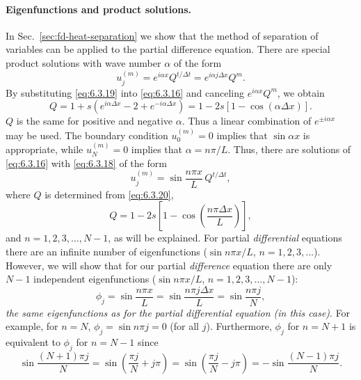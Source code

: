 \paragraph{Eigenfunctions and product solutions.}
In Sec.~\ref{sec:fd-heat-separation} we show that the method of separation of variables can be applied to the partial difference equation.  There are special product solutions with wave number $\alpha$ of the form
\begin{equation}
u_j^{(m)} = e^{i\alpha x}Q^{t/\Delta t} = e^{i\alpha j\Delta x}Q^m.
\label{eq:6.3.19}
\end{equation}
By substituting \eqref{eq:6.3.19} into \eqref{eq:6.3.16} and canceling $e^{i\alpha x}Q^m$, we obtain
\begin{equation}
Q = 1 + s(e^{i\alpha\Delta x} - 2 + e^{-i\alpha\Delta x}) = 1 - 2s[1 - \cos(\alpha\Delta x)].
\label{eq:6.3.20}
\end{equation}
$Q$ is the same for positive and negative $\alpha$.  Thus a linear combination of $e^{\pm i\alpha x}$ may be used.  The boundary condition $u_0^{(m)} = 0$ implies that $\sin\alpha x$ is appropriate, while $u_N^{(m)} = 0$ implies that $\alpha = n\pi/L$.  Thus, there are solutions of \eqref{eq:6.3.16} with \eqref{eq:6.3.18} of the form
\begin{equation}
\boxed{u_j^{(m)} = \sin\frac{n\pi x}{L}\,Q^{t/\Delta t},}
\label{eq:6.3.21}
\end{equation}
where $Q$ is determined from \eqref{eq:6.3.20},
\begin{equation}
\boxed{Q = 1 - 2s\left[1 - \cos\!\left(\frac{n\pi\Delta x}{L}\right)\right],}
\label{eq:6.3.22}
\end{equation}
and $n = 1, 2, 3, \ldots, N-1$, as will be explained.  For partial \emph{differential} equations there are an infinite number of eigenfunctions ($\sin n\pi x/L$, $n = 1, 2, 3, \ldots$).  However, we will show that for our partial \emph{difference} equation there are only $N-1$ independent eigenfunctions ($\sin n\pi x/L$, $n = 1, 2, 3, \ldots, N-1$):
\begin{equation}
\phi_j = \sin\frac{n\pi x}{L} = \sin\frac{n\pi j\Delta x}{L} = \sin\frac{n\pi j}{N},
\label{eq:6.3.23}
\end{equation}
\emph{the same eigenfunctions as for the partial differential equation (in this case)}.  For example, for $n = N$, $\phi_j = \sin n\pi j = 0$ (for all $j$).  Furthermore, $\phi_j$ for $n = N+1$ is equivalent to $\phi_j$ for $n = N-1$ since
\[
\sin\frac{(N+1)\pi j}{N} = \sin\!\left(\frac{\pi j}{N} + j\pi\right) = \sin\!\left(\frac{\pi j}{N} - j\pi\right) = -\sin\frac{(N-1)\pi j}{N}.
\]
